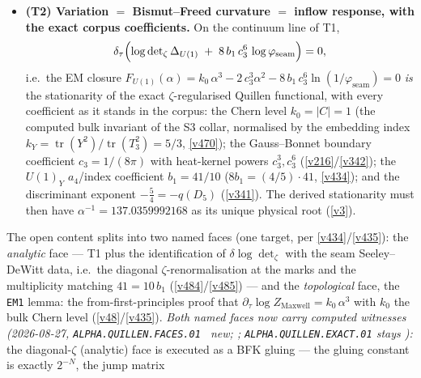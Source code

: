 \documentclass[11pt,a4paper]{article}
\newcommand{\cthree}{c_3}
\begin{document}
\begin{itemize}
  \emph{Dai--Freed data.} A Dai--Freed vector requires an actual family of fillings
  and takes values in the pulled-back inverse boundary line. A global nonvanishing
  section may be asserted only on that pullback or on a specified anomaly-cancelled
  product, not on the uncompensated line with nonzero $c_1$. Alternatively, cylinders and
  mapping tori may define transport and holonomy without a global trivialisation.
  All continuum comparison statements remain \mO; the finite Berry/gap results
  of \vref{v472} are unchanged.
\item \textbf{(T2) Variation $=$ Bismut--Freed curvature $=$ inflow response, with the exact
  corpus coefficients.} On the continuum line of T1,
  \[
    \delta_\tau\Bigl(\log\det\nolimits_\zeta\Delta_{U(1)}\;+\;8\,b_1\,\cthree^{6}\,
    \log\varphi_{\mathrm{seam}}\Bigr)=0 ,
  \]
  i.e.\ the EM closure $F_{U(1)}(\alpha)=k_0\,\alpha^3-2\,\cthree^{3}\alpha^2-8\,b_1\,\cthree^{6}
  \ln(1/\varphi_{\mathrm{seam}})=0$ \emph{is} the stationarity of the exact
  $\zeta$-regularised Quillen functional, with every coefficient as it stands in the corpus:
  the Chern level $k_0=|C|=1$ (the computed bulk invariant of the S3 collar, normalised by the
  embedding index $k_Y=\operatorname{tr}(Y^2)/\operatorname{tr}(T_3^2)=5/3$, \vref{v470}); the
  Gauss--Bonnet boundary coefficient $\cthree=1/(8\pi)$ with heat-kernel powers
  $\cthree^{3},\cthree^{6}$ (\vref{v216}/\vref{v342}); the $U(1)_Y$ $a_4$/index coefficient
  $b_1=41/10$ ($8b_1=(4/5)\cdot41$, \vref{v434}); and the discriminant exponent
  $-\tfrac54=-q(D_5)$ (\vref{v341}). The derived stationarity must then have
  $\alpha^{-1}=137.0359992168$ as its unique physical root (\vref{v3}).
\end{itemize}
The open content splits into two named faces (one target, per \vref{v434}/\vref{v435}): the
\emph{analytic} face --- T1 plus the identification of $\delta\log\det_\zeta$ with the seam
Seeley--DeWitt data, i.e.\ the diagonal $\zeta$-renormalisation at the marks and the
multiplicity matching $41=10\,b_1$ (\vref{v484}/\vref{v485}) --- and the \emph{topological}
face, the \texttt{EM1} lemma: the from-first-principles proof that
$\partial_\tau\log Z_{\mathrm{Maxwell}}=k_0\,\alpha^3$ with $k_0$ the bulk Chern level
(\vref{v48}/\vref{v435}).
\emph{Both named faces now carry computed witnesses (2026-08-27,
\texttt{ALPHA.QUILLEN.FACES.01} \mE\ new; ;
\texttt{ALPHA.QUILLEN.EXACT.01} stays \mO):} the diagonal-$\zeta$ (analytic) face is executed
as a BFK gluing --- the gluing constant is exactly $2^{-N}$, the jump matrix
\end{document}
